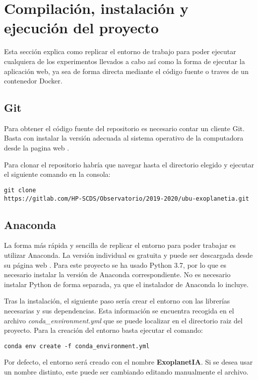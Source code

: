 \section{Compilación, instalación y ejecución del proyecto}

Esta sección explica como replicar el entorno de trabajo para poder ejecutar cualquiera de los experimentos llevados a cabo así como la forma de ejecutar la aplicación web, ya sea de forma directa mediante el código fuente o traves de un contenedor Docker.

\subsection{Git}

Para obtener el código fuente del repositorio es necesario contar un cliente Git. Basta con instalar la versión adecuada al sistema operativo de la computadora desde la pagina web \cite{Git}.

Para clonar el repositorio habría que navegar hasta el directorio elegido y ejecutar el siguiente comando en la consola:

\texttt{git clone\\ https://gitlab.com/HP-SCDS/Observatorio/2019-2020/ubu-exoplanetia.git}

\subsection{Anaconda}

La forma más rápida y sencilla de replicar el entorno para poder trabajar es utilizar Anaconda. La versión individual es gratuita y puede ser descargada desde su página web \cite{Anaconda}. Para este proyecto se ha usado Python 3.7, por lo que es necesario instalar la versión de Anaconda correspondiente. No es necesario instalar Python de forma separada, ya que el instalador de Anaconda lo incluye.

Tras la instalación, el siguiente paso sería crear el entorno con las librerías necesarias y sus dependencias. Esta información se encuentra recogida en el archivo \textit{conda\_environment.yml} que se puede localizar en el directorio raiz del proyecto. Para la creación del entorno basta ejecutar el comando:

\texttt{conda env create -f conda\_environment.yml}

Por defecto, el entorno será creado con el nombre \textbf{ExoplanetIA}. Si se desea usar un nombre distinto, este puede ser cambiando editando manualmente el archivo.

